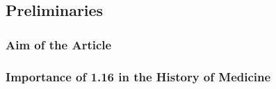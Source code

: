 \subsection{Preliminaries}

\subsubsection{Aim of the Article}
\subsubsection{Importance of 1.16 in the History of Medicine}

